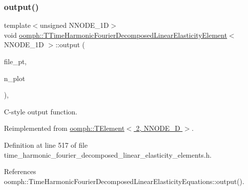 \subsubsection{\texorpdfstring{output()}{output()}\hspace{0.1cm}{\footnotesize\ttfamily [4/4]}}
{\footnotesize\ttfamily template$<$unsigned N\+N\+O\+D\+E\+\_\+1D$>$ \\
void \hyperlink{classoomph_1_1TTimeHarmonicFourierDecomposedLinearElasticityElement}{oomph\+::\+T\+Time\+Harmonic\+Fourier\+Decomposed\+Linear\+Elasticity\+Element}$<$ N\+N\+O\+D\+E\+\_\+1D $>$\+::output (\begin{DoxyParamCaption}\item[{F\+I\+LE $\ast$}]{file\+\_\+pt,  }\item[{const unsigned \&}]{n\+\_\+plot }\end{DoxyParamCaption})\hspace{0.3cm}{\ttfamily [inline]}, {\ttfamily [virtual]}}



C-\/style output function. 



Reimplemented from \hyperlink{classoomph_1_1TElement_3_012_00_01NNODE__1D_01_4_a9c5e3dba68906cb65e1f38eb0638080c}{oomph\+::\+T\+Element$<$ 2, N\+N\+O\+D\+E\+\_\+D $>$}.



Definition at line 517 of file time\+\_\+harmonic\+\_\+fourier\+\_\+decomposed\+\_\+linear\+\_\+elasticity\+\_\+elements.\+h.



References oomph\+::\+Time\+Harmonic\+Fourier\+Decomposed\+Linear\+Elasticity\+Equations\+::output().

\mbox{\label{classoomph_1_1TTimeHarmonicFourierDecomposedLinearElasticityElement_ad02188b226cc083ee4712a2dd51739ba}} 
